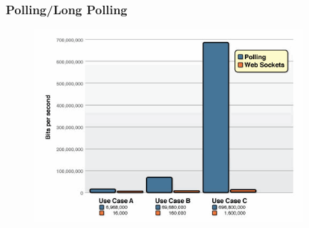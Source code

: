 \documentclass{beamer}
\begin{document}
\begin{frame}
\frametitle{Polling/Long Polling}
\begin{figure}
\end{figure}
\end{frame}

\begin{frame}
\begin{figure}
\begin{center}
\includegraphics[width=10cm]{poll-ws-compare.png}
\end{center}
\end{figure}
\end{frame}
\end{document}
